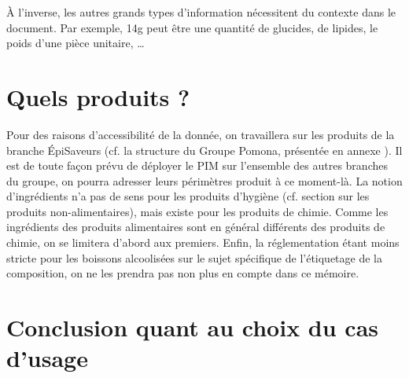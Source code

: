             \`{A} l'inverse, les autres grands types d'information nécessitent du contexte dans le document.
            Par exemple, \og 14g \fg peut être une quantité de glucides, de lipides, le poids d'une pièce unitaire, \dots
            

        \section{Quels produits ?}
        
        Pour des raisons d'accessibilité de la donnée, on travaillera sur les produits de la branche \'{E}piSaveurs (cf. la structure du Groupe Pomona, présentée en annexe ). 
        Il est de toute façon prévu de déployer le PIM sur l'ensemble des autres branches du groupe, on pourra adresser leurs périmètres produit à ce moment-là.
        La notion d'ingrédients n'a pas de sens pour les produits d'hygiène (cf. section  sur les produits non-alimentaires), mais existe pour les produits de chimie.
        Comme les ingrédients des produits alimentaires sont en général différents des produits de chimie, on se limitera d'abord aux premiers.
        Enfin, la réglementation étant moins stricte pour les boissons alcoolisées sur le sujet spécifique de l'étiquetage de la composition, on ne les prendra pas non plus en compte dans ce mémoire.

        \section{Conclusion quant au choix du cas d'usage}

